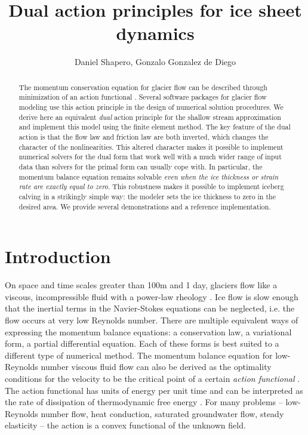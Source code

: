 \documentclass{article}
\title{Dual action principles for ice sheet dynamics}
\author{Daniel Shapero, Gonzalo Gonzalez de Diego}
\date{}
\theoremstyle{definition}
\theoremstyle{plain}
\begin{document}
\maketitle

\begin{abstract}
    The momentum conservation equation for glacier flow can be described through minimization of an action functional \citep{bassis2010hamilton, dukowicz2010consistent}.
    Several software packages for glacier flow modeling use this action principle in the design of numerical solution procedures.
    We derive here an equivalent \emph{dual} action principle for the shallow stream approximation and implement this model using the finite element method.
    The key feature of the dual action is that the flow law and friction law are both inverted, which changes the character of the nonlinearities.
    This altered character makes it possible to implement numerical solvers for the dual form that work well with a much wider range of input data than solvers for the primal form can usually cope with.
    In particular, the momentum balance equation remains solvable \emph{even when the ice thickness or strain rate are exactly equal to zero}.
    This robustness makes it possible to implement iceberg calving in a strikingly simple way: the modeler sets the ice thickness to zero in the desired area.
    We provide several demonstrations and a reference implementation.
\end{abstract}


\section{Introduction}

On space and time scales greater than 100m and 1 day, glaciers flow like a viscous, incompressible fluid with a power-law rheology \citep{greve2009dynamics}.
Ice flow is slow enough that the inertial terms in the Navier-Stokes equations can be neglected, i.e. the flow occurs at very low Reynolds number.
There are multiple equivalent ways of expressing the momentum balance equations: a conservation law, a variational form, a partial differential equation.
Each of these forms is best suited to a different type of numerical method.
The momentum balance equation for low-Reynolds number viscous fluid flow can also be derived as the optimality conditions for the velocity to be the critical point of a certain \emph{action functional} \citep{dukowicz2010consistent}.
The action functional has units of energy per unit time and can be interpreted as the rate of dissipation of thermodynamic free energy \citep{edelen1972nonlinear}.
For many problems -- low-Reynolds number flow, heat conduction, saturated groundwater flow, steady elasticity -- the action is a convex functional of the unknown field.
\end{document}
